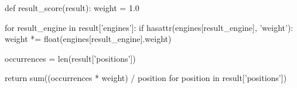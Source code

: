 \begin{python}
def result_score(result):
    weight = 1.0

    for result_engine in result['engines']:
        if hasattr(engines[result_engine], 'weight'):
            weight *= float(engines[result_engine].weight)

    occurrences = len(result['positions'])

    return sum((occurrences * weight) / position for position in result['positions'])
\end{python}
